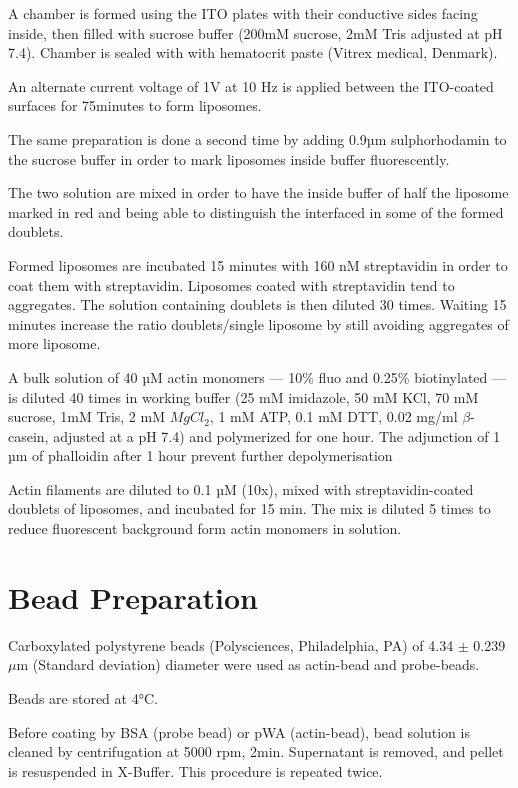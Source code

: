 \documentclass[A4paperpaper,11pt,english]{sphinxmanual}
\begin{document}
A chamber is formed using the ITO plates with their conductive sides facing
inside, then filled with sucrose buffer (200mM sucrose, 2mM Tris adjusted at pH
7.4). Chamber is sealed with with hematocrit paste (Vitrex medical, Denmark).

An alternate current voltage of 1V at 10 Hz is applied between the ITO-coated
surfaces for 75minutes to form liposomes.

The same preparation is done a second time by adding 0.9µm sulphorhodamin to
the sucrose buffer in order to mark liposomes inside buffer fluorescently.

The two solution are mixed in order to have the inside buffer of half the
liposome marked in red and being able to distinguish the interfaced in some of
the formed doublets.

Formed liposomes are incubated 15 minutes with 160 nM streptavidin in order to
coat them with streptavidin. Liposomes coated with streptavidin tend to
aggregates.  The solution containing doublets is then diluted 30 times. Waiting
15 minutes increase the ratio doublets/single liposome by still avoiding
aggregates of more liposome.

A bulk solution of 40 µM actin monomers — 10\% fluo and 0.25\% biotinylated — is
diluted 40 times in working buffer (25 mM imidazole, 50 mM KCl, 70 mM sucrose,
1mM Tris, 2 mM \(MgCl_2\), 1 mM ATP, 0.1 mM DTT, 0.02 mg/ml \(\beta\)-casein, adjusted at a
pH 7.4) and polymerized for one hour. The adjunction of 1 µm of phalloidin
after 1 hour prevent further depolymerisation

Actin filaments are
diluted to 0.1 µM (10x), mixed with streptavidin-coated doublets of
liposomes, and incubated for 15 min. The mix is diluted 5 times to reduce fluorescent background form actin monomers in solution.


\section{Bead Preparation}
\label{index-latex:id6}\label{index-latex:bead-preparation}
Carboxylated polystyrene beads (Polysciences, Philadelphia, PA) of 4.34 \(\pm\) 0.239
\(\mu\)m (Standard deviation) diameter were used as actin-bead and probe-beads.

Beads are stored at 4°C.

Before coating by BSA (probe bead) or pWA (actin-bead), bead solution is
cleaned by centrifugation at 5000 rpm, 2min. Supernatant is removed, and pellet
is resuspended in X-Buffer. This procedure is repeated twice.
\end{document}
